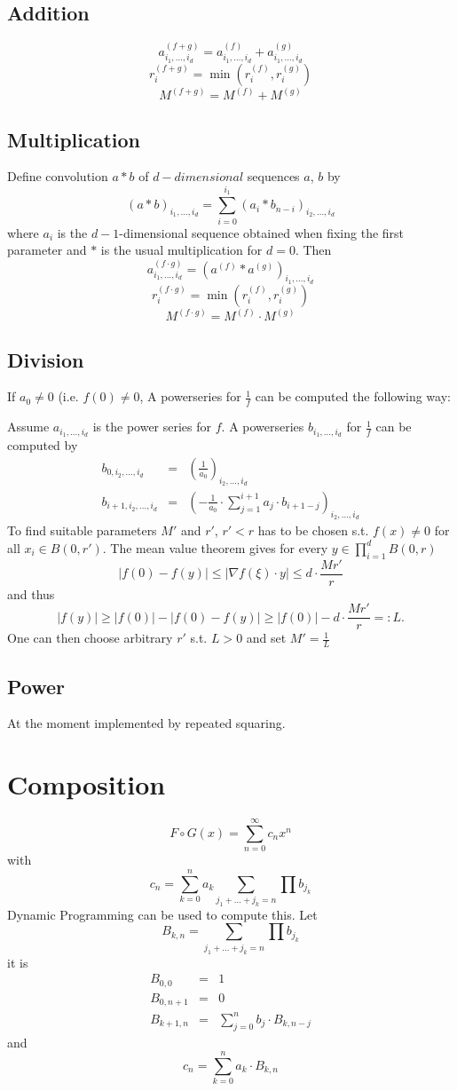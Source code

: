 \documentclass[]{article}
\newcommand{\abs}[1]{\left|#1\right|}
\begin{document}
\subsection{Addition}
$$a^{(f+g)}_{i_1,\dots,i_d} = a^{(f)}_{i_1,\dots,i_d}+a^{(g)}_{i_1,\dots,i_d}$$
$$r_i^{(f+g)} = \min(r_i^{(f)}, r_i^{(g)}) $$
$$M^{(f+g)} = M^{(f)}+M^{(g)}$$
\subsection{Multiplication}
Define convolution $a * b$ of $d-dimensional$ sequences $a$, $b$ by 
$$ (a * b)_{i_1, \dots, i_d} = \sum_{i=0}^{i_1} (a_i * b_{n-i})_{i_2, \dots, i_d} $$
where $a_i$ is the $d-1$-dimensional sequence obtained when fixing the first parameter and $*$ is the usual multiplication for $d=0$.
Then
$$a^{(f \cdot g)}_{i_1,\dots,i_d} = (a^{(f)}*a^{(g)})_{i_1, \dots, i_d}$$
$$r_i^{(f \cdot g)} = \min(r_i^{(f)}, r_i^{(g)}) $$
$$M^{(f \cdot g)} = M^{(f)} \cdot M^{(g)}$$
\subsection{Division}
If $a_0 \neq 0$ (i.e. $f(0) \neq 0$, A powerseries for $\frac{1}{f}$ can be computed the following way:

Assume $a_{i_1,\dots, i_d}$ is the power series for $f$. 
A powerseries $b_{i_1,\dots, i_d}$ for $\frac{1}{f}$ can be computed by
\begin{eqnarray*}
b_{0, i_2, \dots, i_d} &=& \left(\frac{1}{a_0}\right)_{i_2, \dots, i_d} \\
b_{i+1, i_2, \dots, i_d} &=& \left( -\frac{1}{a_0} \cdot \sum_{j=1}^{i+1}a_j \cdot b_{i+1-j}\right)_{i_2,\dots,i_d}
\end{eqnarray*}
To find suitable parameters $M'$ and $r'$, $r'<r$ has to be chosen s.t. $f(x) \neq 0$ for all $x_i \in B(0, r')$. 
The mean value theorem gives for every $y \in \prod_{i=1}^d B(0, r)$
$$ \abs{f(0)-f(y)} \leq \abs{\nabla f(\xi) \cdot y} \leq d \cdot \frac{Mr'}{r}$$
and thus
\begin{equation*}\label{divlowerbound}
\abs{f(y)} \geq \abs{f(0)}-\abs{f(0)-f(y)} \geq \abs{f(0)}-d\cdot \frac{Mr'}{r} =: L.
\end{equation*}
One can then choose arbitrary $r'$ s.t. $L > 0$ and set $M' = \frac{1}{L}$
\subsection{Power}
At the moment implemented by repeated squaring.
\section{Composition}
$$ F \circ G (x) = \sum_{n=0}^\infty c_n x^n $$
with
$$ c_n = \sum_{k=0}^n a_k \sum_{j_1+ \dots + j_k = n} \prod b_{j_k}$$
Dynamic Programming can be used to compute this.
Let
$$ B_{k, n} = \sum_{j_1 + \dots + j_k = n} \prod b_{j_k}$$
it is
\begin{eqnarray*}
  B_{0,0} & = & 1 \\
  B_{0, n+1} &=& 0 \\
  B_{k+1, n} &=& \sum_{j=0}^n b_j \cdot B_{k, n-j}
\end{eqnarray*}
and
$$c_n = \sum_{k=0}^n a_k \cdot B_{k,n}$$
\end{document}
